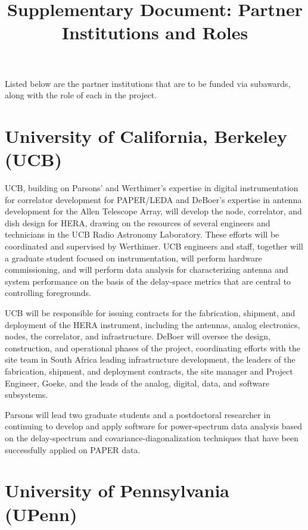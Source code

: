 \documentclass[preprint]{aastex}
\begin{document}
\title{Supplementary Document:  Partner Institutions and Roles}

\noindent
Listed below are the partner institutions that are to be funded
via subawards, along with the role of each in the project.
\vspace{0.25in}


\section*{University of California, Berkeley (UCB)}

UCB, building on Parsons' and Werthimer's expertise in digital
instrumentation for correlator development for PAPER/LEDA
and DeBoer's expertise in antenna development for the Allen Telescope
Array, will develop the node, correlator, and dish design for HERA,
drawing on the resources of several engineers and technicians in
the UCB Radio Astronomy Laboratory.  
These efforts will be coordinated and supervised by Werthimer.  
UCB engineers and staff, together will a graduate student focused
on instrumentation, will perform hardware commissioning, and will
perform data analysis for characterizing antenna and system performance
on the basis of the delay-space metrics that are central to
controlling foregrounds.

UCB will be responsible for issuing contracts for the fabrication,
shipment, and deployment of the HERA instrument, including the antennas,
analog electronics, nodes, the correlator, and infrastructure.
DeBoer 
will oversee the design, construction, and operational phases of the
project, coordinating efforts with the site team in South Africa leading
infrastructure development, the leaders of the fabrication, 
shipment, and deployment contracts, 
the site manager and Project Engineer, Goeke, and the leads of
the analog, digital, data, and software subsystems.

Parsons will lead two graduate students and a postdoctoral researcher
in continuing to develop and apply software for power-spectrum data
analysis based on the delay-spectrum and covariance-diagonalization
techniques that have been successfully applied on PAPER data.  

\section*{University of Pennsylvania (UPenn)}
\end{document}
